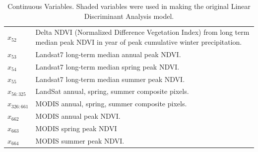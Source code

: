 \def\year{2017}\relax \documentclass[letterpaper]{article}
\begin{document}
\begin{table}
\begin{tabularx}{\linewidth}{@{ }l X@{ }}
\cellcolor[gray]{0.9}$x_{52}$ & \cellcolor[gray]{0.9}Delta NDVI (Normalized Difference Vegetation Index) from long term median peak NDVI in year of peak cumulative winter precipitation.\\
$x_{53}$&Landsat7 long-term median annual peak NDVI.\\
$x_{54}$&Landsat7 long-term median spring peak NDVI.\\
$x_{55}$&Landsat7 long-term median summer peak NDVI.\\
$x_{56:325}$ &  LandSat annual, spring, summer composite pixels.\\
$x_{326:661}$ & MODIS annual, spring, summer composite pixels.\\
$x_{662}$ &  MODIS annual peak NDVI.\\
$x_{663}$ & MODIS spring peak NDVI\\
$x_{664}$ & MODIS summer peak NDVI.\\
\bottomrule[.2em]
\end{tabularx}
\caption{Continuous Variables. Shaded variables were used in making the original Linear Discriminant Analysis model.} \label{tab:data}
\end{table}
\end{document}
